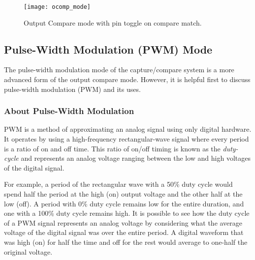 \documentclass[11pt,fleqn]{book} %
\begin{document}
%        
%        
        \begin{figure}[]
            \centering\texttt{[image: ocomp\_mode]}
            \caption{Output Compare mode with pin toggle on compare match.}
            \label{ocomp_mode}
        \end{figure}
    
    
    \subsection{Pulse-Width Modulation (PWM) Mode}
    The pulse-width modulation mode of the capture/compare system is a more advanced form of the output compare mode. However, it is helpful first to discuss pulse-width modulation (PWM) and its uses. 
    
    \subsubsection{About Pulse-Width Modulation}
    PWM is a method of approximating an analog signal using only digital hardware. It operates by using a high-frequency rectangular-wave signal where every period is a ratio of on and off time. This ratio of on/off timing is known as the \textit{duty-cycle} and represents an analog voltage ranging between the low and high voltages of the digital signal. 
    
    For example, a period of the rectangular wave with a 50\% duty cycle would spend half the period at the high (on) output voltage and the other half at the low (off). A period with 0\% duty cycle remains low for the entire duration, and one with a 100\% duty cycle remains high. It is possible to see how the duty cycle of a PWM signal represents an analog voltage by considering what the average voltage of the digital signal was over the entire period. A digital waveform that was high (on) for half the time and off for the rest would average to one-half the original voltage.  
    
\end{document}
